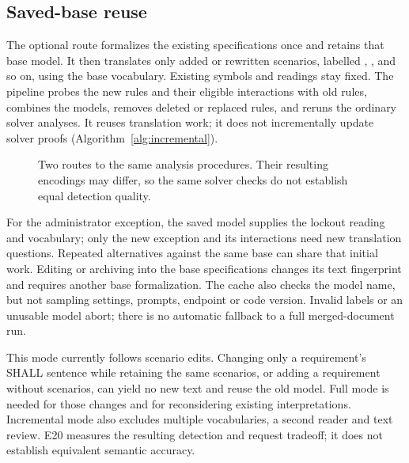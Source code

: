 \subsection{Saved-base reuse}\label{sec:incremental}

The optional  route formalizes the existing specifications once and retains that base model. It then translates only added or rewritten scenarios, labelled , , and so on, using the base vocabulary. Existing symbols and readings stay fixed. The pipeline probes the new rules and their eligible interactions with old rules, combines the models, removes deleted or replaced rules, and reruns the ordinary solver analyses. It reuses translation work; it does not incrementally update solver proofs (Algorithm~\ref{alg:incremental}).

\begin{figure}[H]
\centering
\resizebox{\linewidth}{!}{}
\caption{Two routes to the same analysis procedures. Their resulting encodings may differ, so the same solver checks do not establish equal detection quality.}\label{fig:incremental}
\end{figure}

For the administrator exception, the saved model supplies the lockout reading and vocabulary; only the new exception and its interactions need new translation questions. Repeated alternatives against the same base can share that initial work. Editing or archiving into the base specifications changes its text fingerprint and requires another base formalization. The cache also checks the model name, but not sampling settings, prompts, endpoint or code version. Invalid labels or an unusable model abort; there is no automatic fallback to a full merged-document run.

This mode currently follows scenario edits. Changing only a requirement's SHALL sentence while retaining the same scenarios, or adding a requirement without scenarios, can yield no new text and reuse the old model. Full mode is needed for those changes and for reconsidering existing interpretations. Incremental mode also excludes multiple vocabularies, a second reader and text review. E20 measures the resulting detection and request tradeoff; it does not establish equivalent semantic accuracy.

